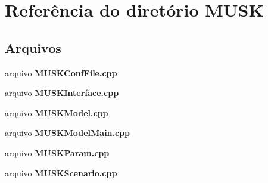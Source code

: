 \section{Referência do diretório M\+U\+SK}
\label{dir_561b666b9f3000cf44db9df382ce515a}
\subsection*{Arquivos}
\begin{DoxyCompactItemize}
\item 
arquivo {\bf M\+U\+S\+K\+Conf\+File.\+cpp}
\item 
arquivo {\bf M\+U\+S\+K\+Interface.\+cpp}
\item 
arquivo {\bf M\+U\+S\+K\+Model.\+cpp}
\item 
arquivo {\bf M\+U\+S\+K\+Model\+Main.\+cpp}
\item 
arquivo {\bf M\+U\+S\+K\+Param.\+cpp}
\item 
arquivo {\bf M\+U\+S\+K\+Scenario.\+cpp}
\end{DoxyCompactItemize}
